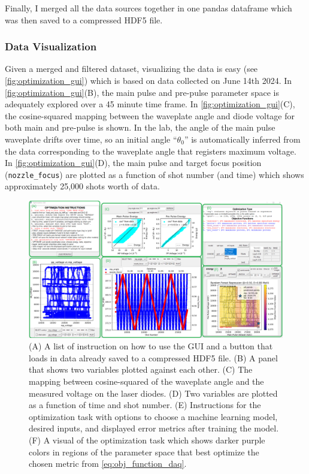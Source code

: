 Finally, I merged all the data sources together in one pandas dataframe which was then saved to a compressed \gls{HDF5} file.

\subsubsection{Data Visualization}
Given a merged and filtered dataset, visualizing the data is easy (see \autoref{fig:optimization_gui}) which is based on data collected on June 14th 2024. In \autoref{fig:optimization_gui}(B), the main pulse and pre-pulse parameter space is adequately explored over a 45 minute time frame. In \autoref{fig:optimization_gui}(C), the cosine-squared mapping between the waveplate angle and diode voltage for both main and pre-pulse is shown. In the lab, the angle of the main pulse waveplate drifts over time, so an initial angle ``$\theta_0$'' is automatically inferred from the data corresponding to the waveplate angle that registers maximum voltage. In \autoref{fig:optimization_gui}(D), the main pulse and target focus position (\texttt{nozzle\_focus}) are plotted as a function of shot number (and time) which shows approximately 25,000 shots worth of data.

\begin{figure}
	\centering 
	\includegraphics[width=\linewidth]{planning/images/daq/optimization_gui.png}
	\caption{(A) A list of instruction on how to use the \gls{GUI} and a button that loads in data already saved to a compressed \gls{HDF5} file. (B) A panel that shows two variables plotted against each other. (C) The mapping between cosine-squared of the waveplate angle and the measured voltage on the laser diodes. (D) Two variables are plotted as a function of time and shot number. (E) Instructions for the optimization task with options to choose a machine learning model, desired inputs, and displayed error metrics after training the model. (F) A visual of the optimization task which shows darker purple colors in regions of the parameter space that best optimize the chosen metric from \autoref{eq:obj_function_daq}.}
	\label{fig:optimization_gui}
\end{figure}

